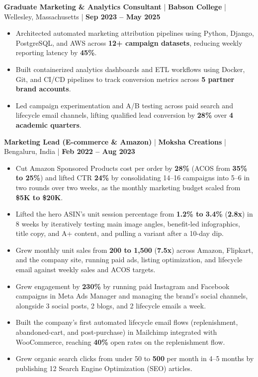 \documentclass[11pt,letterpaper]{article}
\newcommand{\job}[4]{%
  \textbf{#1} \;|\; \textbf{#2} \;|\; #3 \;|\; \textbf{#4}\par%
  \vspace{1pt}%
}
\begin{document}
\job{Graduate Marketing \& Analytics Consultant}
{Babson College}
{Wellesley, Massachusetts}
{Sep 2023 -- May 2025}
\begin{itemize}
  \item Architected automated marketing attribution pipelines using Python, Django, PostgreSQL, and AWS across \textbf{12+ campaign datasets}, reducing weekly reporting latency by \textbf{45\%}.
  \item Built containerized analytics dashboards and ETL workflows using Docker, Git, and CI/CD pipelines to track conversion metrics across \textbf{5 partner brand accounts}.
  \item Led campaign experimentation and A/B testing across paid search and lifecycle email channels, lifting qualified lead conversion by \textbf{28\%} over \textbf{4 academic quarters}.
\end{itemize}

\job{Marketing Lead (E-commerce \& Amazon)}
{Moksha Creations}
{Bengaluru, India}
{Feb 2022 -- Aug 2023}
\begin{itemize}
  \item Cut Amazon Sponsored Products cost per order by \textbf{28\%} (ACOS from \textbf{35\% to 25\%}) and lifted CTR \textbf{24\%} by consolidating 14--16 campaigns into 5--6 in two rounds over two weeks, as the monthly marketing budget scaled from \textbf{\$5K to \$20K}.
  \item Lifted the hero ASIN's unit session percentage from \textbf{1.2\% to 3.4\%} (\textbf{2.8x}) in 8 weeks by iteratively testing main image angles, benefit-led infographics, title copy, and A+ content, and pulling a variant after a 10-day dip.
  \item Grew monthly unit sales from \textbf{200 to 1,500} (\textbf{7.5x}) across Amazon, Flipkart, and the company site, running paid ads, listing optimization, and lifecycle email against weekly sales and ACOS targets.
  \item Grew engagement by \textbf{230\%} by running paid Instagram and Facebook campaigns in Meta Ads Manager and managing the brand's social channels, alongside 3 social posts, 2 blogs, and 2 lifecycle emails a week.
  \item Built the company's first automated lifecycle email flows (replenishment, abandoned-cart, and post-purchase) in Mailchimp integrated with WooCommerce, reaching \textbf{40\%} open rates on the replenishment flow.
  \item Grew organic search clicks from under 50 to \textbf{500} per month in 4--5 months by publishing 12 Search Engine Optimization (SEO) articles.
\end{itemize}
\end{document}
